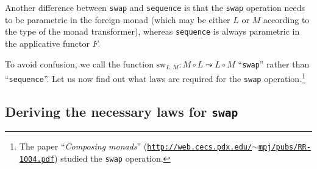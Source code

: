 Another difference between \lstinline!swap! and \lstinline!sequence!
is that the \texttt{}\lstinline!swap! operation needs to be parametric
in the foreign monad (which may be either $L$ or $M$ according to
the type of the monad transformer), whereas \lstinline!sequence!
is always parametric in the applicative functor $F$. %
\begin{comment}
\emph{This is actually confusing! Let\textsf{'}s not do this and always write
$\text{sw}_{L}^{M}:M^{L^{A}}\rightarrow L^{M^{A}}$}

To denote more clearly the monad with respect to which \lstinline!swap!
is parametric, we may write
\begin{align*}
\text{sw}_{L}^{M}:L^{M^{A}}\rightarrow M^{L^{A}}\quad & \text{for the composed-inside transformers,}\\
\text{sw}_{L}^{M}:M^{L^{A}}\rightarrow L^{M^{A}}\quad & \text{for the composed-outside transformers.}
\end{align*}
The superscript $M$ in $\text{sw}_{L}^{M}$ shows that $M$ is a
\emph{type parameter} in \lstinline!swap!; that is, \lstinline!swap!
is parametric in the monad $M$. The subscript $L$ in $\text{sw}_{L}^{M}$
shows that the implementations of \lstinline!swap! may need to use
completely different code for different monads $L$.
\end{comment}

To avoid confusion, we call the function $\text{sw}_{L,M}:M\circ L\leadsto L\circ M$
\textsf{``}\lstinline!swap!\textsf{''} rather than \textsf{``}\lstinline!sequence!\textsf{''}. Let
us now find out what laws are required for the \texttt{}\lstinline!swap!
operation.\footnote{The paper \textsf{``}\emph{Composing monads}\textsf{''} (\texttt{\href{http://web.cecs.pdx.edu/~mpj/pubs/RR-1004.pdf}{http://web.cecs.pdx.edu/$\sim$mpj/pubs/RR-1004.pdf}})
studied the \lstinline!swap! operation.}

\subsection{Deriving the necessary laws for \texttt{swap}}

